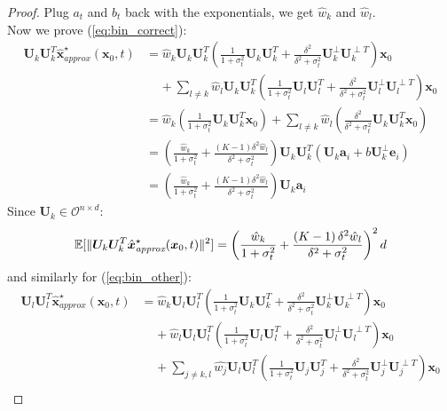 \begin{proof}
    Plug $a_t$ and $b_t$ back with the exponentials, we get $\hat{w}_k$ and $\hat{w}_l$. \\

    Now we prove (\ref{eq:bin_correct}):
    \begin{align*}
        \bm U_k \bm U_k^T \hat{\bm x}_{\textit{approx}}^{\star}(\bm x_0, t) &= \hat{w}_k \bm U_k \bm U_k^T \left(\frac{1}{1+\sigma_t^2} \bm U_k \bm U_k^T + \frac{\delta^2}{\delta^2 + \sigma_t^2} \bm U_k^{\perp} \bm U_k^{\perp T} \right) \bm x_0 \\
        &\;\;\;\; + \sum_{l \neq k}\hat{w}_l \bm U_k \bm U_k^T \left(\frac{1}{1+\sigma_t^2} \bm U_l \bm U_l^T + \frac{\delta^2}{\delta^2 + \sigma_t^2} \bm U_l^{\perp} \bm U_l^{\perp T} \right) \bm x_0 \\
        &= \hat{w}_k \left( \frac{1}{1 + \sigma_t^2} \bm U_k \bm U_k^T \bm x_0 \right) + \sum_{l \neq k}\hat{w}_l \left( \frac{\delta^2}{\delta^2 + \sigma_t^2} \bm U_k \bm U_k^T \bm x_0\right) \\
        &= \left( \frac{\hat{w}_k}{1+\sigma_t^2} + \frac{\left(K-1 \right)\delta^2 \hat{w}_l}{\delta^2 + \sigma_t^2} \right) \bm U_k \bm U_k^T (\bm U_k \bm a_i + b\bm U_k^{\perp} \bm e_i) \\
        &= \left( \frac{\hat{w}_k}{1+\sigma_t^2} + \frac{\left(K-1 \right)\delta^2 \hat{w}_l}{\delta^2 + \sigma_t^2} \right) \bm U_k \bm a_i
    \end{align*}
    Since $\bm U_k \in \mathcal{O}^{n \times d}$:
    \begin{align*}
        \operatorname{\mathbb{E}}[\| \bm U_k \bm U_k^T \hat{\bm x}_{\textit{approx}}^{\star}(\bm x_0, t) \|^2] = \left( \frac{\hat{w}_k}{1+\sigma_t^2} + \frac{\left(K-1 \right)\delta^2 \hat{w}_l}{\delta^2 + \sigma_t^2} \right)^2 d
    \end{align*}
    \vspace{-0.1in}
    and similarly for (\ref{eq:bin_other}):
    \begin{align*}
        \bm U_l \bm U_l^T \hat{\bm x}_{\textit{approx}}^{\star}(\bm x_0, t) &= \hat{w}_k \bm U_l \bm U_l^T \left(\frac{1}{1+\sigma_t^2} \bm U_k \bm U_k^T + \frac{\delta^2}{\delta^2 + \sigma_t^2} \bm U_k^{\perp} \bm U_k^{\perp T} \right) \bm x_0 \\
        &\;\;\;\; + \hat{w}_l \bm U_l \bm U_l^T \left(\frac{1}{1+\sigma_t^2} \bm U_l \bm U_l^T + \frac{\delta^2}{\delta^2 + \sigma_t^2} \bm U_l^{\perp} \bm U_l^{\perp T} \right) \bm x_0 \\
        &\;\;\;\; + \sum_{j\neq k,l}\hat{w_j} \bm U_l \bm U_l^T \left(\frac{1}{1+\sigma_t^2} \bm U_j \bm U_j^T + \frac{\delta^2}{\delta^2 + \sigma_t^2} \bm U_j^{\perp} \bm U_j^{\perp T} \right) \bm x_0 \\

\end{align*}
\end{proof}
